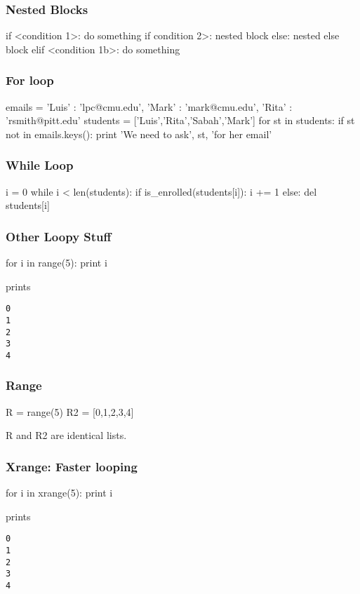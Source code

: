 \begin{frame}[fragile]
\frametitle{Nested Blocks}

\begin{python}
if <condition 1>:
    do something
    if condition 2>:
        nested block
    else:
        nested else block
elif <condition 1b>:
    do something
\end{python}
\end{frame}

\begin{frame}[fragile]
\frametitle{For loop}

\begin{python}
emails = { 'Luis' : 'lpc@cmu.edu',
           'Mark' : 'mark@cmu.edu',
           'Rita' : 'rsmith@pitt.edu' }
students = ['Luis','Rita','Sabah','Mark']
for st in students:
    if st not in emails.keys():
        print 'We need to ask', st, 'for her email'
\end{python}
\end{frame}

\begin{frame}[fragile]
\frametitle{While Loop}

\begin{python}
i = 0
while i < len(students):
    if is_enrolled(students[i]):
        i += 1
    else:
        del students[i]
\end{python}
\end{frame}

\begin{frame}[fragile]
\frametitle{Other Loopy Stuff}

\begin{python}
for i in range(5):
    print i
\end{python}

prints

\begin{verbatim}
0
1
2
3
4
\end{verbatim}
\end{frame}

\begin{frame}[fragile]
\frametitle{Range}
\begin{python}
R = range(5)
R2 = [0,1,2,3,4]
\end{python}

R and R2 are identical lists.
\end{frame}

\begin{frame}[fragile]
\frametitle{Xrange: Faster looping}
\begin{python}
for i in xrange(5):
    print i
\end{python}

prints

\begin{verbatim}
0
1
2
3
4
\end{verbatim}
\end{frame}

